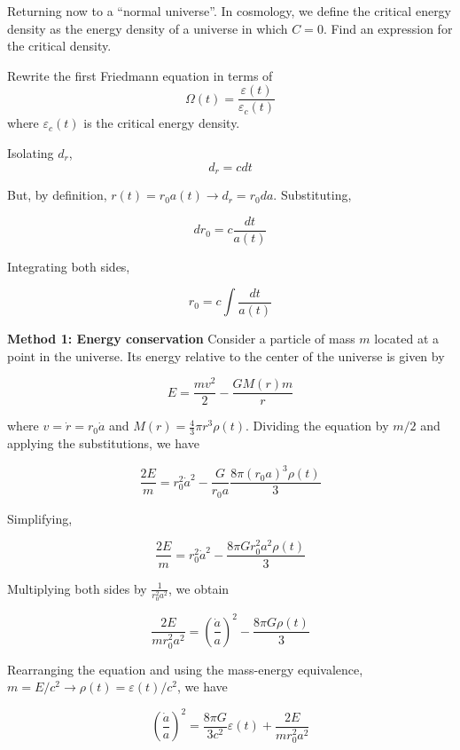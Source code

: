 \documentclass[11pt]{article}
\begin{document}
\begin{pproblem}
\begin{enumerate}[label=\roman*)]
\begin{alternativas}
            \item Returning now to a ``normal universe''. In cosmology, we define the critical energy density as the energy density of a universe in which \(C = 0\). Find an expression for the critical density.
            \item Rewrite the first Friedmann equation in terms of
            \[\Omega(t) = \frac{\varepsilon(t)}{\varepsilon_c(t)}\]
            where \(\varepsilon_c(t)\) is the critical energy density.
        \end{alternativas}
    \end{enumerate}
\begin{pssolution*}{}{ }
    \begin{alternativas}
        \item Isolating \(d_r\),
        \[d_r = c dt\]

        But, by definition, \(r(t) = r_0 a(t) \rightarrow d_r = r_0 da\). Substituting,

        \[dr_0 = c\frac{dt}{a(t)}\]

        Integrating both sides,

        \[r_0 = c\int \frac{dt}{a(t)}\]

        \item \textbf{Method 1: Energy conservation}
        Consider a particle of mass \(m\) located at a point in the universe. Its energy relative to the center of the universe is given by

        \[E = \frac{mv^2}{2} - \frac{GM(r)m}{r}\]

        where \(v = \dot{r} = r_0 \dot{a}\) and \(M(r) = \frac{4}{3} \pi r^3 \rho(t)\). Dividing the equation by \(m/2\) and applying the substitutions, we have

        \[\frac{2E}{m} = r_0^2 \dot{a}^2 - \frac{G}{r_0 a} \frac{8\pi (r_0 a)^3 \rho(t)}{3}\]

        Simplifying,

        \[\frac{2E}{m} = r_0^2 \dot{a}^2 - \frac{8\pi G r_0^2 a^2 \rho(t)}{3}\]

        Multiplying both sides by \(\frac{1}{r_0^2 a^2}\), we obtain

        \[\frac{2E}{mr_0^2 a^2} = \left(\frac{\dot{a}}{a}\right)^2 - \frac{8\pi G \rho(t)}{3}\]

        Rearranging the equation and using the mass-energy equivalence, \(m = E/c^2 \rightarrow \rho(t) = \varepsilon(t)/c^2\), we have

        \[\left(\frac{\dot{a}}{a}\right)^2 = \frac{8\pi G}{3 c^2} \varepsilon(t) + \frac{2E}{mr_0^2 a^2}\]


\end{alternativas}
\end{pssolution*}
\end{pproblem}
\end{document}
